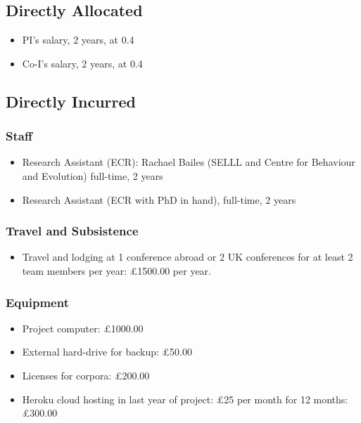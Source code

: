 \documentclass[11pt]{article}
\begin{document}
\subsection{Directly Allocated}

\begin{itemize}
	\item PI's salary, 2 years, at 0.4
	
	\item Co-I's salary, 2 years, at 0.4
	
\end{itemize}


\subsection{Directly Incurred}

\subsubsection{Staff}

\begin{itemize}
	\item Research Assistant (ECR): Rachael Bailes (SELLL and Centre for Behaviour and Evolution) full-time, 2 years
	
	\item Research Assistant (ECR with PhD in hand), full-time, 2 years
\end{itemize}


\subsubsection{Travel and Subsistence}

\begin{itemize}
	\item Travel and lodging at 1 conference abroad or 2 UK conferences for at least 2 team members per year: £1500.00 per year.
\end{itemize}


\subsubsection{Equipment}

\begin{itemize}
	\item Project computer: £1000.00
	\item External hard-drive for backup: £50.00
	\item Licenses for corpora: £200.00
	\item Heroku cloud hosting in last year of project: £25 per month for 12 months: £300.00
\end{itemize}
\end{document}

